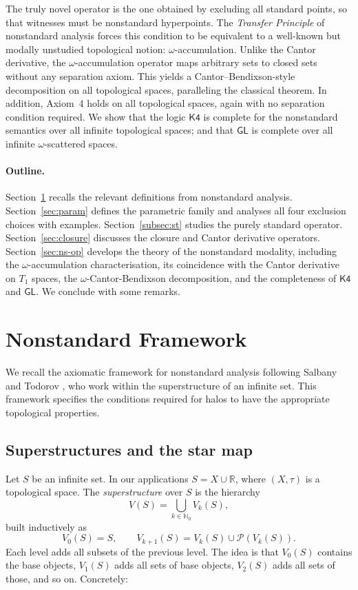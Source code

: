\documentclass[submission,copyright,creativecommons]{eptcs}
\begin{document}
The truly novel operator is the one obtained by excluding all standard points, so that witnesses must be nonstandard hyperpoints.
The \emph{Transfer Principle} of nonstandard analysis forces this condition to be equivalent to a well-known but modally unstudied topological notion: $\omega$-accumulation.
Unlike the Cantor derivative, the $\omega$-accumulation operator maps arbitrary sets to closed sets without any separation axiom.
This yields a Cantor--Bendixson-style decomposition on all topological spaces, paralleling the classical theorem.
In addition, Axiom~4 holds on all topological spaces, again with no separation condition required.
We show that the logic $\mathsf{K4}$ is complete for the nonstandard semantics over all infinite topological spaces; and that $\mathsf{GL}$ is complete over all infinite $\omega$-scattered spaces.

\paragraph{Outline.}
Section~\ref{sec:ns} recalls the relevant definitions from nonstandard analysis.
Section~\ref{sec:param} defines the parametric family and analyses all four exclusion choices with examples.
Section~\ref{subsec:st} studies the purely standard operator.
Section~\ref{sec:closure} discusses the closure and Cantor derivative operators.
Section~\ref{sec:ns-op} develops the theory of the nonstandard modality, including the $\omega$-accumulation characterisation, its coincidence with the Cantor derivative on $T_1$ spaces, the $\omega$-Cantor-Bendixson decomposition, and the completeness of $\mathsf{K4}$ and $\mathsf{GL}$.
We conclude with some remarks.

\section{Nonstandard Framework}
\label{sec:ns}

We recall the axiomatic framework for nonstandard analysis following Salbany and Todorov \cite{SalbanyTodorov1999}, who work within the superstructure of an infinite set. 
This framework specifies the conditions required for halos to have the appropriate topological properties.

\subsection{Superstructures and the star map}

Let $S$ be an infinite set. In our applications $S = X \cup \mathbb{R}$, where $(X,\tau)$ is a topological space.
The \emph{superstructure} over $S$ is the hierarchy
\[
  V(S) = \bigcup_{k \in \mathbb{N}_0} V_k(S),
\]
built inductively as
\[
  V_0(S) = S, \qquad V_{k+1}(S) = V_k(S) \cup \mathcal{P}(V_k(S)).
\]
Each level adds all subsets of the previous level. The idea is that $V_0(S)$ contains the base objects, $V_1(S)$ adds all sets of base objects, $V_2(S)$ adds all sets of those, and so on. Concretely:
\end{document}
